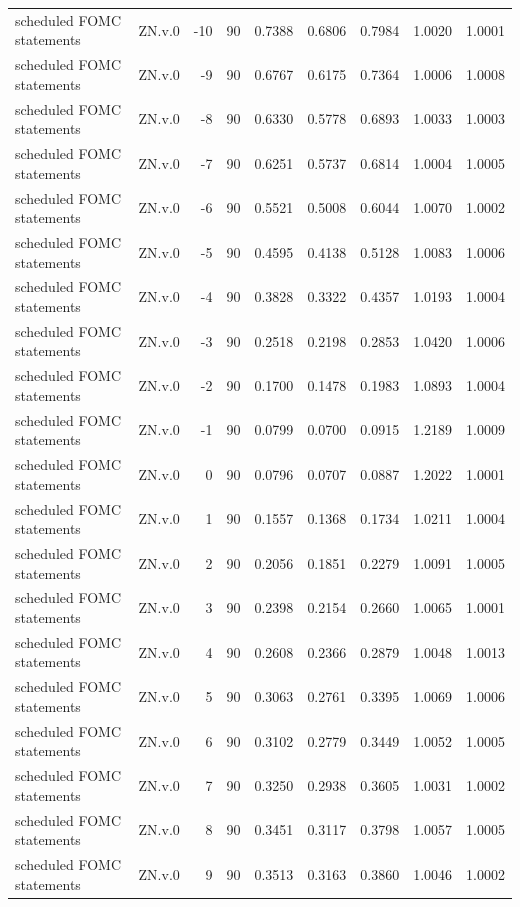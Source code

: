 \begin{tabular}{llrrrrrrr}
scheduled FOMC statements & ZN.v.0 & -10 & 90 & 0.7388 & 0.6806 & 0.7984 & 1.0020 & 1.0001 \\
scheduled FOMC statements & ZN.v.0 & -9 & 90 & 0.6767 & 0.6175 & 0.7364 & 1.0006 & 1.0008 \\
scheduled FOMC statements & ZN.v.0 & -8 & 90 & 0.6330 & 0.5778 & 0.6893 & 1.0033 & 1.0003 \\
scheduled FOMC statements & ZN.v.0 & -7 & 90 & 0.6251 & 0.5737 & 0.6814 & 1.0004 & 1.0005 \\
scheduled FOMC statements & ZN.v.0 & -6 & 90 & 0.5521 & 0.5008 & 0.6044 & 1.0070 & 1.0002 \\
scheduled FOMC statements & ZN.v.0 & -5 & 90 & 0.4595 & 0.4138 & 0.5128 & 1.0083 & 1.0006 \\
scheduled FOMC statements & ZN.v.0 & -4 & 90 & 0.3828 & 0.3322 & 0.4357 & 1.0193 & 1.0004 \\
scheduled FOMC statements & ZN.v.0 & -3 & 90 & 0.2518 & 0.2198 & 0.2853 & 1.0420 & 1.0006 \\
scheduled FOMC statements & ZN.v.0 & -2 & 90 & 0.1700 & 0.1478 & 0.1983 & 1.0893 & 1.0004 \\
scheduled FOMC statements & ZN.v.0 & -1 & 90 & 0.0799 & 0.0700 & 0.0915 & 1.2189 & 1.0009 \\
scheduled FOMC statements & ZN.v.0 & 0 & 90 & 0.0796 & 0.0707 & 0.0887 & 1.2022 & 1.0001 \\
scheduled FOMC statements & ZN.v.0 & 1 & 90 & 0.1557 & 0.1368 & 0.1734 & 1.0211 & 1.0004 \\
scheduled FOMC statements & ZN.v.0 & 2 & 90 & 0.2056 & 0.1851 & 0.2279 & 1.0091 & 1.0005 \\
scheduled FOMC statements & ZN.v.0 & 3 & 90 & 0.2398 & 0.2154 & 0.2660 & 1.0065 & 1.0001 \\
scheduled FOMC statements & ZN.v.0 & 4 & 90 & 0.2608 & 0.2366 & 0.2879 & 1.0048 & 1.0013 \\
scheduled FOMC statements & ZN.v.0 & 5 & 90 & 0.3063 & 0.2761 & 0.3395 & 1.0069 & 1.0006 \\
scheduled FOMC statements & ZN.v.0 & 6 & 90 & 0.3102 & 0.2779 & 0.3449 & 1.0052 & 1.0005 \\
scheduled FOMC statements & ZN.v.0 & 7 & 90 & 0.3250 & 0.2938 & 0.3605 & 1.0031 & 1.0002 \\
scheduled FOMC statements & ZN.v.0 & 8 & 90 & 0.3451 & 0.3117 & 0.3798 & 1.0057 & 1.0005 \\
scheduled FOMC statements & ZN.v.0 & 9 & 90 & 0.3513 & 0.3163 & 0.3860 & 1.0046 & 1.0002 \\

\end{tabular}
